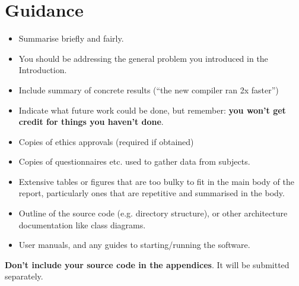 \documentclass{l4proj}
\begin{document}
\section{Guidance}
\begin{itemize}
    \item
        Summarise briefly and fairly.
    \item
        You should be addressing the general problem you introduced in the
        Introduction.        
    \item
        Include summary of concrete results (``the new compiler ran 2x
        faster'')
    \item
        Indicate what future work could be done, but remember: \textbf{you
        won't get credit for things you haven't done}.
\end{itemize}

%
% 

\begin{appendices}



\begin{itemize}
\item
  Copies of ethics approvals (required if obtained)
\item
  Copies of questionnaires etc. used to gather data from subjects.
\item
  Extensive tables or figures that are too bulky to fit in the main body of
  the report, particularly ones that are repetitive and summarised in the body.

\item Outline of the source code (e.g. directory structure), or other architecture documentation like class diagrams.

\item User manuals, and any guides to starting/running the software.

\end{itemize}

\textbf{Don't include your source code in the appendices}. It will be
submitted separately.

\end{appendices}






\end{document}
